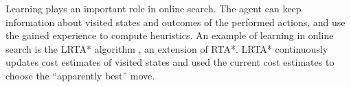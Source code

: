 Learning plays an important role in online search. The agent can keep
information about visited states and outcomes of the performed
actions, and use the gained experience to compute heuristics. An
example of learning in online search is the LRTA* algorithm
\cite{Korf.rta}, an extension of RTA*. LRTA* continuously
updates cost estimates of visited states and used the current cost
estimates to choose the ``apparently best'' move.
